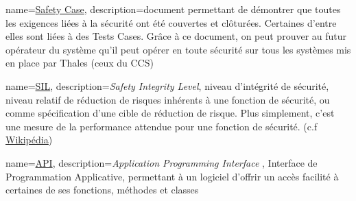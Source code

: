 {
	name=\underline{Safety Case},
	description={document permettant de démontrer que toutes les exigences liées à la sécurité ont été couvertes et clôturées. Certaines d'entre elles sont liées à des Tests Cases. Grâce à ce document, on peut prouver au futur opérateur du système qu'il peut opérer en toute sécurité sur tous les systèmes mis en place par Thales (ceux du CCS)}
	}

{
	name=\underline{SIL},
	description={\textit{Safety Integrity Level}, niveau d'intégrité de sécurité, niveau relatif de réduction de risques inhérents à une fonction de sécurité, ou comme spécification d'une cible de réduction de risque. Plus simplement, c'est une mesure de la performance attendue pour une fonction de sécurité. (c.f \underline{\href{https://fr.wikipedia.org/wiki/Safety_Integrity_Level}{Wikipédia}})}
}

{
	name=\underline{API},
	description={\textit{Application Programming Interface }, Interface de Programmation Applicative, permettant à un logiciel d'offrir un accès facilité à certaines de ses fonctions, méthodes et classes}
}



\glsaddall
